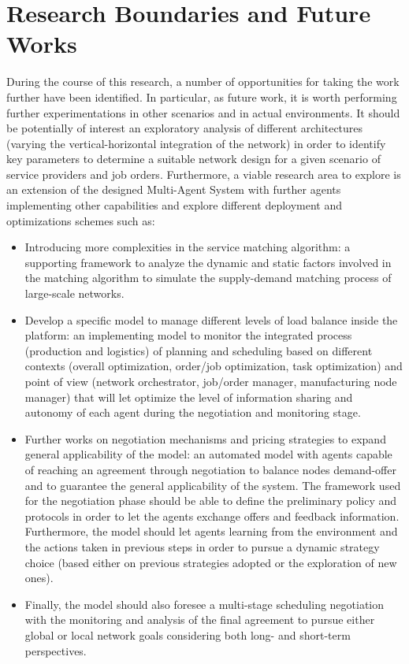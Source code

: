 \section{Research Boundaries and Future Works}
During the course of this research, a number of opportunities for taking the work further have been identified. In particular, as future work, it is worth performing further experimentations in other scenarios and in actual environments. It should be potentially of interest an exploratory analysis of different architectures (varying the vertical-horizontal integration of the network) in order to identify key parameters to determine a suitable network design for a given scenario of service providers and job orders. Furthermore, a viable research area to explore is an extension of the designed Multi-Agent System with further agents implementing other capabilities and explore different deployment and optimizations schemes such as:
\begin{itemize}
    \item Introducing more complexities in the service matching algorithm: a supporting framework to analyze the dynamic and static factors involved in the matching algorithm to simulate the supply-demand matching process of large-scale networks.
    \item Develop a specific model to manage different levels of load balance inside the platform: an implementing model to monitor the integrated process (production and logistics) of planning and scheduling based on different contexts (overall optimization, order/job optimization, task optimization) and point of view (network orchestrator, job/order manager, manufacturing node manager) that will let optimize the level of information sharing and autonomy of each agent during the negotiation and monitoring stage.
    \item Further works on negotiation mechanisms and pricing strategies to expand general applicability of the model: an automated model with agents capable of reaching an agreement through negotiation to balance nodes demand-offer and to guarantee the general applicability of the system. The framework used for the negotiation phase should be able to define the preliminary policy and protocols in order to let the agents exchange offers and feedback information. Furthermore, the model should let agents learning from the environment and the actions taken in previous steps in order to pursue a dynamic strategy choice (based either on previous strategies adopted or the exploration of new ones).
    \item Finally, the model should also foresee a multi-stage scheduling negotiation with the monitoring and analysis of the final agreement to pursue either global or local network goals considering both long- and short-term perspectives.
\end{itemize}
